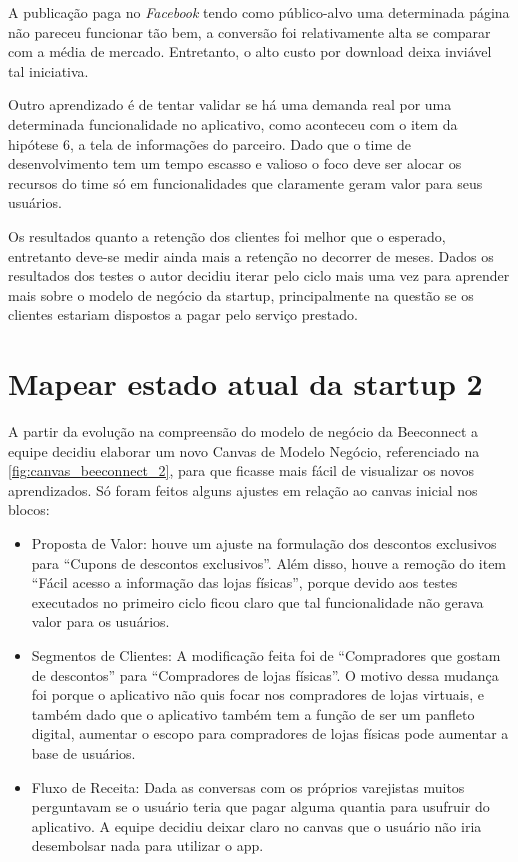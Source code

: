 A publicação paga no \textit{Facebook} tendo como público-alvo uma determinada página não pareceu funcionar tão bem, a conversão foi relativamente alta se comparar com a média de mercado. Entretanto, o alto custo por download deixa inviável tal iniciativa.

Outro aprendizado é de tentar validar se há uma demanda real por uma determinada funcionalidade no aplicativo, como aconteceu com o item da hipótese 6, a tela de informações do parceiro. Dado que o time de desenvolvimento tem um tempo escasso e valioso o foco deve ser alocar os recursos do time só em funcionalidades que claramente geram valor para seus usuários.

Os resultados quanto a retenção dos clientes foi melhor que o esperado, entretanto deve-se medir ainda mais a retenção no decorrer de meses. Dados os resultados dos testes o autor decidiu iterar pelo ciclo mais uma vez para aprender mais sobre o modelo de negócio da startup, principalmente na questão se os clientes estariam dispostos a pagar pelo serviço prestado.

\section{Mapear estado atual da startup 2}
\label{cha:mapear_estado_2}
A partir da evolução na compreensão do modelo de negócio da Beeconnect a equipe decidiu elaborar um novo Canvas de Modelo Negócio, referenciado na \autoref{fig:canvas_beeconnect_2}, para que ficasse mais fácil de visualizar os novos aprendizados. Só foram feitos alguns ajustes em relação ao canvas inicial nos blocos:

\begin{itemize}
\item Proposta de Valor: houve um ajuste na formulação dos descontos exclusivos para \enquote{Cupons de descontos exclusivos}. Além disso, houve a remoção do item \enquote{Fácil acesso a informação das lojas físicas}, porque devido aos testes executados no primeiro ciclo ficou claro que tal funcionalidade não gerava valor para os usuários.
\item Segmentos de Clientes: A modificação feita foi de \enquote{Compradores que gostam de descontos} para \enquote{Compradores de lojas físicas}. O motivo dessa mudança foi porque o aplicativo não quis focar nos compradores de lojas virtuais, e também dado que o aplicativo também tem a função de ser um panfleto digital, aumentar o escopo para compradores de lojas físicas pode aumentar a base de usuários.
\item Fluxo de Receita: Dada as conversas com os próprios varejistas muitos perguntavam se o usuário teria que pagar alguma quantia para usufruir do aplicativo. A equipe decidiu deixar claro no canvas que o usuário não iria desembolsar nada para utilizar o app.
\end{itemize}

